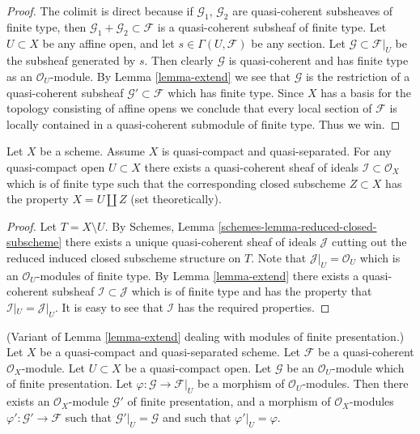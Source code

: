 \begin{proof}
The colimit is direct because if $\mathcal{G}_1$, $\mathcal{G}_2$
are quasi-coherent subsheaves of finite type, then
$\mathcal{G}_1 + \mathcal{G}_2 \subset \mathcal{F}$ is
a quasi-coherent subsheaf of finite type.
Let $U \subset X$ be any affine open, and let
$s \in \Gamma(U, \mathcal{F})$ be any section.
Let $\mathcal{G} \subset \mathcal{F}|_U$ be the
subsheaf generated by $s$. Then clearly $\mathcal{G}$
is quasi-coherent and has finite type as an $\mathcal{O}_U$-module.
By Lemma \ref{lemma-extend} we see that $\mathcal{G}$ is the restriction
of a quasi-coherent subsheaf $\mathcal{G}' \subset \mathcal{F}$
which has finite type. Since $X$ has a basis for the topology consisting
of affine opens we conclude that every local section of
$\mathcal{F}$ is locally contained in a quasi-coherent submodule
of finite type. Thus we win.
\end{proof}

\begin{lemma}
\label{lemma-quasi-coherent-finite-type-ideals}
Let $X$ be a scheme.
Assume $X$ is quasi-compact and quasi-separated.
For any quasi-compact open $U \subset X$ there exists
a quasi-coherent sheaf of ideals $\mathcal{I} \subset \mathcal{O}_X$
which is of finite type such that the corresponding closed
subscheme $Z \subset X$ has the property $X = U \coprod Z$
(set theoretically).
\end{lemma}

\begin{proof}
Let $T = X \setminus U$. By
Schemes, Lemma \ref{schemes-lemma-reduced-closed-subscheme} there exists
a unique quasi-coherent sheaf of ideals $\mathcal{J}$ cutting
out the reduced induced closed subscheme structure on $T$.
Note that $\mathcal{J}|_U = \mathcal{O}_U$ which is an
$\mathcal{O}_U$-modules of finite type.
By Lemma \ref{lemma-extend} there exists a quasi-coherent subsheaf
$\mathcal{I} \subset \mathcal{J}$ which is of finite type
and has the property that $\mathcal{I}|_U = \mathcal{J}|_U$.
It is easy to see that $\mathcal{I}$ has the required properties.
\end{proof}

\begin{lemma}
\label{lemma-extend-finite-presentation}
(Variant of Lemma \ref{lemma-extend} dealing with modules of
finite presentation.)
Let $X$ be a quasi-compact and quasi-separated scheme.
Let $\mathcal{F}$ be a quasi-coherent $\mathcal{O}_X$-module.
Let $U \subset X$ be a quasi-compact open.
Let $\mathcal{G}$ be an $\mathcal{O}_U$-module which of finite presentation.
Let $\varphi : \mathcal{G} \to \mathcal{F}|_U$ be a morphism of
$\mathcal{O}_U$-modules.
Then there exists an $\mathcal{O}_X$-module
$\mathcal{G}'$ of finite presentation, and a morphism
of $\mathcal{O}_X$-modules $\varphi' : \mathcal{G}' \to \mathcal{F}$
such that $\mathcal{G}'|_U = \mathcal{G}$ and such that
$\varphi'|_U = \varphi$.
\end{lemma}

